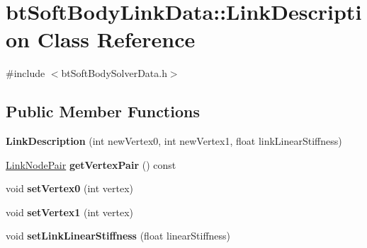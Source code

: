 \hypertarget{classbtSoftBodyLinkData_1_1LinkDescription}{}\section{bt\+Soft\+Body\+Link\+Data\+:\+:Link\+Description Class Reference}
\label{classbtSoftBodyLinkData_1_1LinkDescription}


{\ttfamily \#include $<$bt\+Soft\+Body\+Solver\+Data.\+h$>$}

\subsection*{Public Member Functions}
\begin{DoxyCompactItemize}
\item 
\mbox{\label{classbtSoftBodyLinkData_1_1LinkDescription_ac136d09840b27f48ada71f5974add5f8}} 
{\bfseries Link\+Description} (int new\+Vertex0, int new\+Vertex1, float link\+Linear\+Stiffness)
\item 
\mbox{\label{classbtSoftBodyLinkData_1_1LinkDescription_a1e2dbebf72c49c52b30e30c20d246f21}} 
\hyperlink{classbtSoftBodyLinkData_1_1LinkNodePair}{Link\+Node\+Pair} {\bfseries get\+Vertex\+Pair} () const
\item 
\mbox{\label{classbtSoftBodyLinkData_1_1LinkDescription_ab3749f46658d57ce5a6cd805b0a65051}} 
void {\bfseries set\+Vertex0} (int vertex)
\item 
\mbox{\label{classbtSoftBodyLinkData_1_1LinkDescription_ac18b22edeb1c83f3e8e11f5671ae6b28}} 
void {\bfseries set\+Vertex1} (int vertex)
\item 
\mbox{\label{classbtSoftBodyLinkData_1_1LinkDescription_aa3b2478b69b3baa1ea31c0523899bc0b}} 
void {\bfseries set\+Link\+Linear\+Stiffness} (float linear\+Stiffness)
\item 
\mbox{\label{classbtSoftBodyLinkData_1_1LinkDescription_a12e8defd71d95a31d273f302b76699f0}} 

\end{DoxyCompactItemize}
